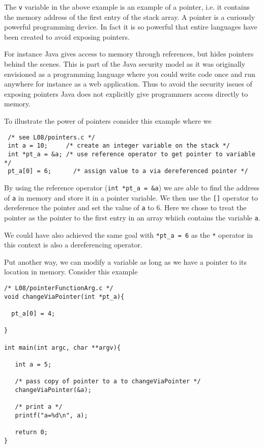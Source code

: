 The \texttt{v} variable in the above example is an example of a pointer, i.e. it contains the memory address of the first entry of the stack array. A pointer is a curiously powerful programming device. In fact it is so powerful that entire languages have been created to avoid exposing pointers. 

For instance Java gives access to memory through references, but hides pointers behind the scenes. This is part of the Java security model as it was originally envisioned as a programming language where you could write code once and run anywhere for instance as a web application. Thus to avoid the security issues of exposing pointers Java does not explicitly give programmers access directly to memory.

To illustrate the power of pointers consider this example where we 

\begin{verbatim}
 /* see L08/pointers.c */
 int a = 10;     /* create an integer variable on the stack */
 int *pt_a = &a; /* use reference operator to get pointer to variable */
 pt_a[0] = 6;      /* assign value to a via dereferenced pointer */
\end{verbatim}

By using the reference operator (\texttt{int *pt\_a = \&a}) we are able to find the address of \texttt{a} in memory and store it in a pointer variable. We then use the \texttt{[]} operator to dereference the pointer and set the value of \texttt{a} to 6. Here we chose to treat the pointer as the pointer to the first entry in an array whiich contains the variable \texttt{a}.

We could have also achieved the same goal with \texttt{*pt\_a = 6} as the \texttt{*} operator in this context is also a dereferencing operator.

Put another way, we can modify a variable as long as we have a pointer to its location in memory. Consider this example

\begin{verbatim}
/* L08/pointerFunctionArg.c */
void changeViaPointer(int *pt_a){

  pt_a[0] = 4;

}

int main(int argc, char **argv){

   int a = 5;
   
   /* pass copy of pointer to a to changeViaPointer */
   changeViaPointer(&a);
 
   /* print a */
   printf("a=%d\n", a);
 
   return 0;
}
\end{verbatim}

